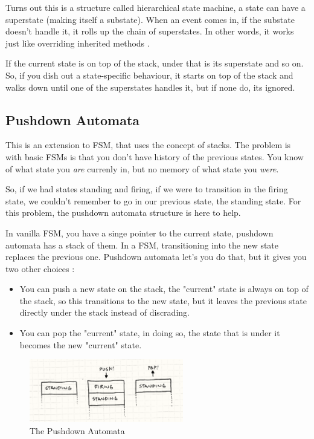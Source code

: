 \documentclass[a4paper, 12pt]{book}
\begin{document}
Turns out this is a structure called hierarchical state machine, a state can have a superstate (making itself a substate). When an event comes in, if the substate doesn’t handle it, it rolls up the chain of superstates. In other words, it works just like overriding inherited methods \cite{GameProgrammingPattersFMS}.

If the current state is on top of the stack, under that is its superstate and so on. So, if you dish out a state-specific behaviour, it starts on top of the stack and walks down until one of the superstates handles it, but if none do, its ignored.

\subsection{Pushdown Automata}

This is an extension to FSM, that uses the concept of stacks. The problem is with basic FSMs is that you don't have history of the previous states. You know of what state you \emph{are} currenly in, but no memory of what state you \emph{were}.

So, if we had states standing and firing, if we were to transition in the firing state, we couldn't remember to go in our previous state, the standing state. For this problem, the pushdown automata structure is here to help.

In vanilla FSM, you have a singe pointer to the current state, pushdown automata has a stack of them. In a FSM, transitioning into the new state replaces the previous one. Pushdown automata let's you do that, but it gives you two other choices \cite{GameProgrammingPattersFMS}:

\begin{itemize}
    \item You can push a new state on the stack, the "current" state is always on top of the stack, so this transitions to the new state, but it leaves the previous state directly under the stack instead of discrading.
    \item You can pop the "current" state, in doing so, the state that is under it becomes the new "current" state.
\end{itemize}

\begin{figure}[h]
\begin{center}
\includegraphics[width=0.6\textwidth]{Images/state_pushdown.png}
\end{center}
\caption{The Pushdown Automata}
\label{pic2}
\end{figure}
\end{document}
